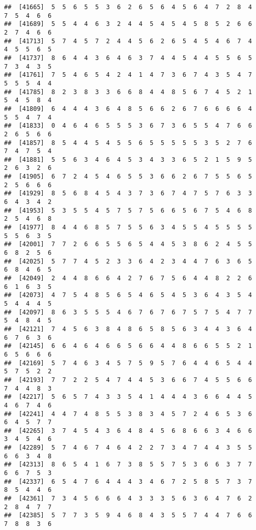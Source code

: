 \documentclass[
]{book}
\begin{document}
\begin{verbatim}
##  [41665]  5  5  6  5  5  3  6  2  6  5  6  4  5  6  4  7  2  8  4  7  5  4  6  6
##  [41689]  5  5  4  4  6  3  2  4  4  5  4  5  4  5  8  5  2  6  6  2  7  4  6  6
##  [41713]  5  7  4  5  7  2  4  4  5  6  2  6  5  4  5  4  6  7  4  4  5  5  6  5
##  [41737]  8  6  4  4  3  6  4  6  3  7  4  4  5  4  4  5  5  6  5  7  3  4  3  5
##  [41761]  7  5  4  6  5  4  2  4  1  4  7  3  6  7  4  3  5  4  7  5  5  5  4  4
##  [41785]  8  2  3  8  3  3  6  6  8  4  4  8  5  6  7  4  5  2  1  5  4  5  8  4
##  [41809]  6  4  4  4  3  6  4  8  5  6  6  2  6  7  6  6  6  6  4  5  5  4  7  4
##  [41833]  0  4  6  4  6  5  5  5  3  6  7  3  6  5  5  4  7  6  6  2  6  5  6  6
##  [41857]  8  5  4  4  5  4  5  5  6  5  5  5  5  5  3  5  2  7  6  7  4  7  5  4
##  [41881]  5  5  6  3  4  6  4  5  3  4  3  3  6  5  2  1  5  9  5  2  6  3  2  6
##  [41905]  6  7  2  4  5  4  6  5  5  3  6  6  2  6  7  5  5  6  5  2  5  6  6  6
##  [41929]  8  5  6  8  4  5  4  3  7  3  6  7  4  7  5  7  6  3  3  6  4  3  4  2
##  [41953]  5  3  5  5  4  5  7  5  7  5  6  6  5  6  7  5  4  6  8  2  5  4  6  8
##  [41977]  8  4  4  6  8  5  7  5  5  6  3  4  5  5  4  5  5  5  5  5  5  6  3  5
##  [42001]  7  7  2  6  6  5  5  6  5  4  4  5  3  8  6  2  4  5  5  6  8  2  5  6
##  [42025]  5  7  7  4  5  2  3  3  6  4  2  3  4  4  7  6  3  6  5  6  8  4  6  5
##  [42049]  2  4  4  8  6  6  4  2  7  6  7  5  6  4  4  8  2  2  6  6  1  6  3  5
##  [42073]  4  7  5  4  8  5  6  5  4  6  5  4  5  3  6  4  3  5  4  5  4  4  4  5
##  [42097]  8  6  3  5  5  5  4  6  7  6  7  6  7  5  7  5  4  7  7  5  4  8  4  5
##  [42121]  7  4  5  6  3  8  4  8  6  5  8  5  6  3  4  4  3  6  4  6  7  6  3  6
##  [42145]  6  6  4  6  4  6  6  5  6  6  4  4  8  6  6  5  5  2  1  6  5  6  6  6
##  [42169]  5  7  4  6  3  4  5  7  5  9  5  7  6  4  4  6  5  4  4  5  7  5  2  2
##  [42193]  7  7  2  2  5  4  7  4  4  5  3  6  6  7  4  5  5  6  6  7  4  4  8  3
##  [42217]  5  6  5  7  4  3  3  5  4  1  4  4  4  3  6  6  4  4  5  4  6  7  4  6
##  [42241]  4  4  7  4  8  5  5  3  8  3  4  5  7  2  4  6  5  3  6  6  4  5  7  7
##  [42265]  3  7  4  5  4  3  6  4  8  4  5  6  8  6  6  3  4  6  6  3  4  5  4  6
##  [42289]  5  7  4  6  7  4  6  4  2  2  7  3  4  7  4  4  3  5  5  6  6  3  4  8
##  [42313]  8  6  5  4  1  6  7  3  8  5  5  7  5  3  6  6  3  7  7  6  6  7  5  3
##  [42337]  6  5  4  7  6  4  4  4  3  4  6  7  2  5  8  5  7  3  7  8  5  4  4  6
##  [42361]  7  3  4  5  6  6  6  4  3  3  3  5  6  3  6  4  7  6  2  2  8  4  7  7
##  [42385]  5  7  7  3  5  9  4  6  8  4  3  5  5  7  4  4  7  6  6  7  8  8  3  6

\end{verbatim}
\end{document}
